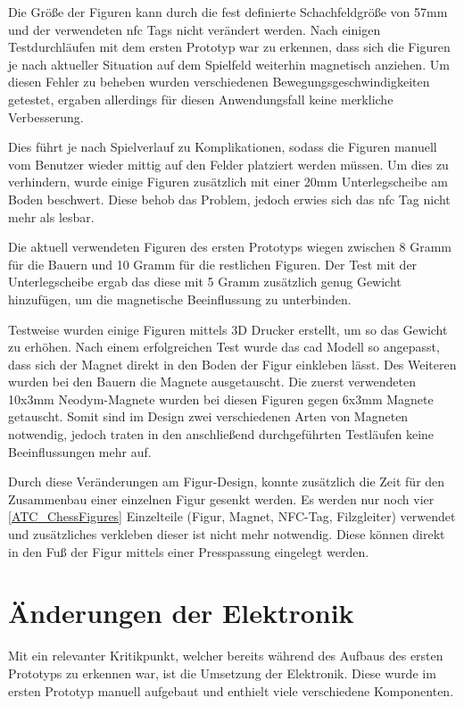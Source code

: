 Die Größe der Figuren kann durch die fest definierte Schachfeldgröße von
57mm und der verwendeten \gls{nfc} Tags nicht verändert werden. Nach
einigen Testdurchläufen mit dem ersten Prototyp war zu erkennen, dass
sich die Figuren je nach aktueller Situation auf dem Spielfeld weiterhin
magnetisch anziehen. Um diesen Fehler zu beheben wurden verschiedenen
Bewegungsgeschwindigkeiten getestet, ergaben allerdings für diesen
Anwendungsfall keine merkliche Verbesserung.

Dies führt je nach Spielverlauf zu Komplikationen, sodass die Figuren
manuell vom Benutzer wieder mittig auf den Felder platziert werden
müssen. Um dies zu verhindern, wurde einige Figuren zusätzlich mit einer
20mm Unterlegscheibe am Boden beschwert. Diese behob das Problem, jedoch
erwies sich das \gls{nfc} Tag nicht mehr als lesbar.

Die aktuell verwendeten Figuren des ersten Prototyps wiegen zwischen 8
Gramm für die Bauern und 10 Gramm für die restlichen Figuren. Der Test
mit der Unterlegscheibe ergab das diese mit 5 Gramm zusätzlich genug
Gewicht hinzufügen, um die magnetische Beeinflussung zu unterbinden.

Testweise wurden einige Figuren mittels 3D Drucker erstellt, um so das
Gewicht zu erhöhen. Nach einem erfolgreichen Test wurde das \gls{cad}
Modell so angepasst, dass sich der Magnet direkt in den Boden der Figur
einkleben lässt. Des Weiteren wurden bei den Bauern die Magnete
ausgetauscht. Die zuerst verwendeten 10x3mm Neodym-Magnete wurden bei
diesen Figuren gegen 6x3mm Magnete getauscht. Somit sind im Design zwei
verschiedenen Arten von Magneten notwendig, jedoch traten in den
anschließend durchgeführten Testläufen keine Beeinflussungen mehr auf.

Durch diese Veränderungen am Figur-Design, konnte zusätzlich die Zeit
für den Zusammenbau einer einzelnen Figur gesenkt werden. Es werden nur
noch vier \ref{ATC_ChessFigures} Einzelteile (Figur, Magnet, NFC-Tag,
Filzgleiter) verwendet und zusätzliches verkleben dieser ist nicht mehr
notwendig. Diese können direkt in den Fuß der Figur mittels einer
Presspassung eingelegt werden.

\hypertarget{uxe4nderungen-der-elektronik}{%
\section{Änderungen der Elektronik}\label{uxe4nderungen-der-elektronik}}

Mit ein relevanter Kritikpunkt, welcher bereits während des Aufbaus des
ersten Prototyps zu erkennen war, ist die Umsetzung der Elektronik.
Diese wurde im ersten Prototyp manuell aufgebaut und enthielt viele
verschiedene Komponenten.

